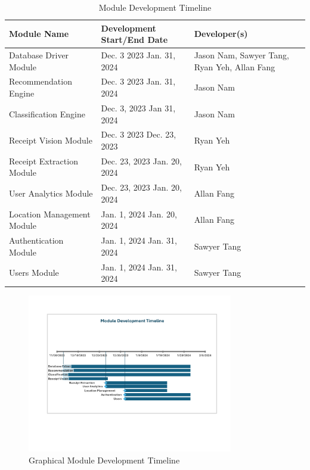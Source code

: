 \documentclass[12pt, titlepage]{article}
\begin{document}
\begin{table}[H]
  \caption{Module Development Timeline}\label{ModuleDevelopmentTimeline}
  \begin{tabular}{|p{}|p{}|p{}|}
    \hline
    \textbf{Module Name} & \textbf{Development Start/End Date} & \textbf{Developer(s)} \\
    \hline
    Database Driver Module & Dec. 3 2023 \textemdash{} Jan. 31, 2024 & Jason Nam, Sawyer Tang, Ryan Yeh, Allan Fang \\
    \hline
    Recommendation Engine & Dec. 3 2023 \textemdash{} Jan. 31, 2024 & Jason Nam \\
    \hline
    Classification Engine & Dec. 3, 2023 \textemdash{} Jan 31, 2024 & Jason Nam\\
    \hline
    Receipt Vision Module & Dec. 3 2023 \textemdash{} Dec. 23, 2023 & Ryan Yeh \\
    \hline
    Receipt Extraction Module & Dec. 23, 2023 \textemdash{} Jan. 20, 2024 & Ryan Yeh \\
    \hline
    User Analytics Module & Dec. 23, 2023 \textemdash{} Jan. 20, 2024 & Allan Fang \\
    \hline
    Location Management Module & Jan. 1, 2024 \textemdash{} Jan. 20, 2024 & Allan Fang \\
    \hline
    Authentication Module & Jan. 1, 2024 \textemdash{} Jan. 31, 2024 & Sawyer Tang \\
    \hline
    Users Module & Jan. 1, 2024 \textemdash{} Jan. 31, 2024 & Sawyer Tang \\
    \hline
  \end{tabular}
\end{table}

\begin{figure}[H]
  \centering
  \caption{Graphical Module Development Timeline}\label{FigureModuleDevelopmentTimeline}
  \includegraphics[width=0.8\textwidth]{./res/ModuleDevTimeline.pdf}
\end{figure}
\end{document}
